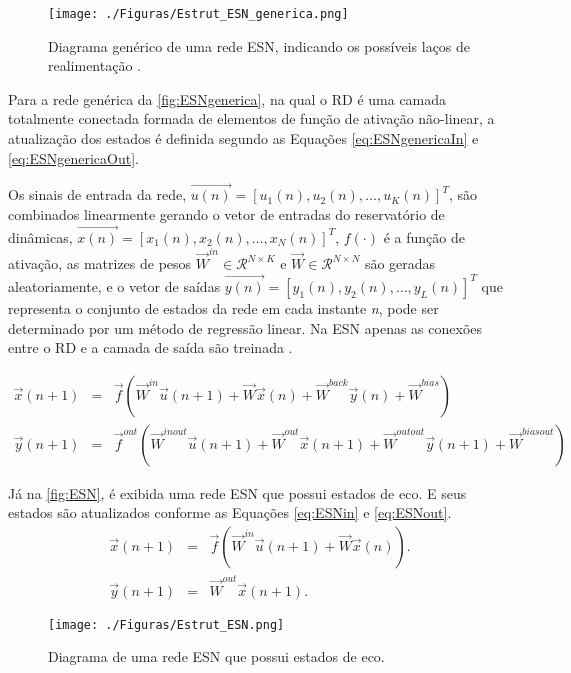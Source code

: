 \begin{figure}[ht]
	\begin{center}
		\caption{Diagrama genérico de uma rede ESN, indicando os possíveis laços de realimentação .}
		\texttt{[image: ./Figuras/Estrut\_ESN\_generica.png]}
		\label{fig:ESNgenerica}
	\end{center}
\end{figure}

Para a rede genérica da \autoref{fig:ESNgenerica}, na qual o RD é uma camada totalmente conectada formada de elementos de função de ativação não-linear, a atualização dos estados é definida segundo as Equações \ref{eq:ESNgenericaIn} e \ref{eq:ESNgenericaOut}.

Os sinais de entrada da rede, $\vec{u(n)} = [u_1(n), u_2(n), \ldots, u_K(n)]^T$, são combinados linearmente gerando o vetor de entradas do reservatório de dinâmicas, $\vec{x(n)} = [x_1(n), x_2(n), \ldots, x_N(n)]^T$, $f(\cdot)$ é a função de ativação, as matrizes de pesos $\vec{W}^{in} \in \mathcal{R}^{N\times K}$ e $\vec{W} \in \mathcal{R}^{N\times N}$ são geradas aleatoriamente, e o vetor de saídas $\vec{y(n)} = [y_1(n), y_2(n), \ldots, y_L(n)]^T$ que representa o conjunto de estados da rede em cada instante \textit{n}, pode ser determinado por um método de regressão linear. Na ESN apenas as conexões entre o RD e a camada de saída são treinada \cite{thesis:simeon2015}.

\begin{eqnarray}
\vec{x}(n+1) &=&  \vec{f}(\vec{W}^{in}\vec{u}(n+1)+\vec{W}\vec{x}(n)+\vec{W}^{back}\vec{y}(n)+\vec{W}^{bias})\label{eq:ESNgenericaIn} \\
\vec{y}(n+1) &=& \vec{f}^{out}(\vec{W}^{inout}\vec{u}(n+1)+\vec{W}^{out}\vec{x}(n+1)+\vec{W}^{outout}\vec{y}(n+1) + \vec{W}^{biasout}) \label{eq:ESNgenericaOut}
\end{eqnarray}

Já na \autoref{fig:ESN}, é exibida uma rede ESN que possui estados de eco. E seus estados são atualizados conforme as Equações \ref{eq:ESNin} e \ref{eq:ESNout}.
\begin{eqnarray}
\vec{x}(n+1) &=&  \vec{f}(\vec{W}^{in}\vec{u}(n+1)+\vec{W}\vec{x}(n)).  \label{eq:ESNin}  \\
\vec{y}(n+1) &=& \vec{W}^{out}\vec{x}(n+1).                             \label{eq:ESNout}
\end{eqnarray}

\begin{figure}[H]
	\begin{center}
		\caption{Diagrama de uma rede ESN que possui estados de eco.}
		\texttt{[image: ./Figuras/Estrut\_ESN.png]}
		\label{fig:ESN}
	\end{center}
\end{figure}

